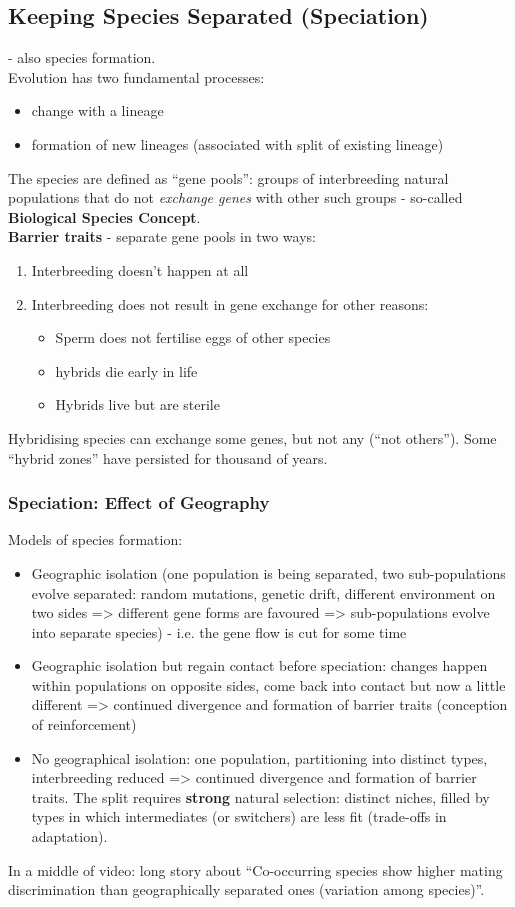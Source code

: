 \documentclass{scrartcl}
\begin{document}
\subsection{Keeping Species Separated (Speciation)}
\label{sec:09-03}
- also species formation.\\
Evolution has two fundamental processes:
\begin{itemize}
\item change with a lineage
\item formation of new lineages (associated with split of existing lineage)
\end{itemize}
The species are defined as ``gene pools'': groups of interbreeding natural populations that do not {\em exchange genes} with other such groups - so-called {\bf Biological Species Concept}.\\
{\bf Barrier traits} - separate gene pools in two ways:
\begin{enumerate}
\item Interbreeding doesn't happen at all
\item Interbreeding does not result in gene exchange for other reasons:
  \begin{itemize}
  \item Sperm does not fertilise eggs of other species
  \item hybrids die early in life
  \item Hybrids live but are sterile
  \end{itemize}
\end{enumerate}
Hybridising species can exchange some genes, but not any (``not others'').
Some ``hybrid zones'' have persisted for thousand of years.

\subsubsection{Speciation: Effect of Geography}
\label{sec:09-04}
Models of species formation:
\begin{itemize}
\item Geographic isolation (one population is being separated, two sub-populations evolve separated: random mutations, genetic drift, different environment on two sides => different gene forms are favoured => sub-populations evolve into separate species) - i.e. the gene flow is cut for some time
\item Geographic isolation but regain contact before speciation: changes happen within populations on opposite sides, come back into contact but now a little different => continued divergence and formation of barrier traits (conception of reinforcement)
\item No geographical isolation: one population, partitioning into distinct types, interbreeding reduced => continued divergence and formation of barrier traits.
The split requires {\bf strong} natural selection: distinct niches, filled by types in which intermediates (or switchers) are less fit (trade-offs in adaptation).
\end{itemize}
In a middle of video: long story about ``Co-occurring species show higher mating discrimination than geographically separated ones (variation among species)''.
\end{document}
